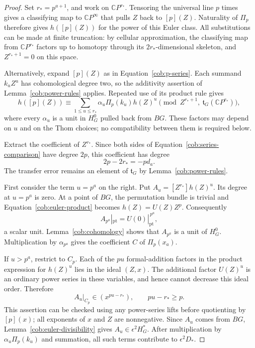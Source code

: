 \begin{proof}
 Set $r_*=p^{a+1}$, and work on $\mathbb CP^{r_*}$.  Tensoring the
 universal line $p$ times gives a classifying map to
 $\mathbb CP^\infty$ that pulls $Z$ back to $[p](Z)$.  Naturality
 of $\Pi_p$ therefore gives $h([p](Z))$ for the power of this
 Euler class.  All substitutions can be made at finite truncation:
 by cellular approximation, the classifying map from
 $\mathbb CP^{r_*}$ factors up to homotopy through its
 $2r_*$-dimensional skeleton, and $Z^{r_*+1}=0$ on this space.

 Alternatively, expand $[p](Z)$ as in Equation~\eqref{cob:p-series}.
 Each summand $k_uZ^u$ has cohomological degree two, so the
 additivity assertion of Lemma~\ref{cob:power-rules} applies.
 Repeated use of its product rule gives
 \begin{equation}
  \label{cob:series-comparison}
  h([p](Z))\equiv
     \sum_{1\leq u\leq r_*}
          \alpha_u\Pi_p(k_u)h(Z)^u
       \pmod{Z^{r_*+1},\ \mathfrak t_G(\mathbb CP^{r_*})},
 \end{equation}
 where every $\alpha_u$ is a unit in $H_G^0$ pulled back from
 $BG$.  These factors may depend on $u$ and on the Thom choices;
 no compatibility between them is required below.

 Extract the coefficient of $Z^{r_*}$.  Since both sides of
 Equation~\eqref{cob:series-comparison} have degree $2p$, this
 coefficient has degree
 \[
  2p-2r_*=-p d_a.
 \]
 The transfer error remains an element of $\mathfrak t_G$ by
 Lemma~\ref{cob:power-rules}.

 First consider the term $u=p^a$ on the right.  Put
 $A_u=[Z^{r_*}]h(Z)^u$.  Its degree at $u=p^a$ is zero.
 At a point of $BG$, the permutation bundle is trivial and
 Equation~\eqref{cob:euler-product} becomes
 $h(Z)=U(Z)Z^p$.  Consequently
 \[
  A_{p^a}|_{\mathrm{pt}}=U(0)|_{\mathrm{pt}}^{\,p^a},
 \]
 a scalar unit.  Lemma~\ref{cob:cohomology} shows that
 $A_{p^a}$ is a unit of $H_G^0$.  Multiplication by
 $\alpha_{p^a}$ gives the coefficient $C$ of $\Pi_p(x_a)$.

 If $u>p^a$, restrict to $C_p$.  Each of the $pu$ formal-addition
 factors in the product expression for $h(Z)^u$ lies in the
 ideal $(Z,x)$.  The additional factor $U(Z)^u$ is an ordinary
 power series in these variables, and hence cannot decrease this
 ideal order.  Therefore
 \[
  A_u|_{C_p}\in(x^{pu-r_*}),\qquad pu-r_*\geq p.
 \]
 This assertion can be checked using any power-series lifts before
 quotienting by $[p](x)$; all exponents of $x$ and $Z$ are
 nonnegative.  Since $A_u$ comes from $BG$,
 Lemma~\ref{cob:euler-divisibility} gives
 $A_u\in\epsilon^2H_G^*$.  After multiplication by
 $\alpha_u\Pi_p(k_u)$ and summation, all such terms contribute
 to $\epsilon^2D_*$.


\end{proof}
